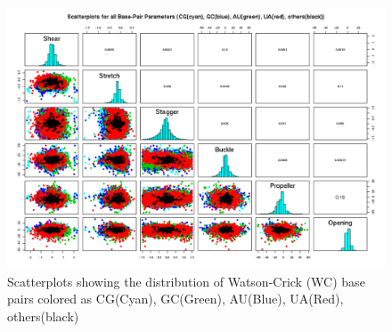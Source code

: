 \begin{figure}[H]
\centering
\includegraphics[scale=0.6, angle=90]{CGGCAUUA.png}
\caption{Scatterplots showing the distribution of Watson-Crick (WC)
  base pairs colored as CG(Cyan), GC(Green), AU(Blue), UA(Red), others(black)}
\label{fig:mainWC}
\end{figure}


